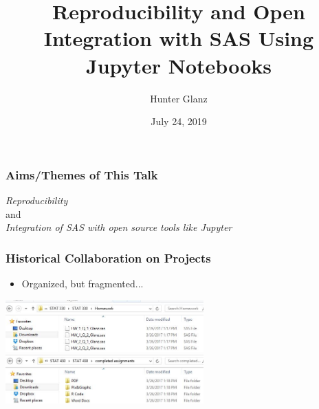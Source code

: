 \documentclass[xcolor={dvipsnames}]{beamer}
\title[]{Reproducibility and Open Integration with SAS Using Jupyter Notebooks}
\author[Glanz]{Hunter Glanz}
\institute[]{California Polytechnic State University \\ San Luis Obispo, California, USA}
\date{July 24, 2019}
\newcommand{\ft}{\frametitle}
\newcommand{\bi}{\begin{itemize}}
\newcommand{\ei}{\end{itemize}}
\begin{document}
\frame{\titlepage}


\begin{frame}
\ft{Aims/Themes of This Talk}
\begin{center}
	\emph{Reproducibility} \\
	\pause
	and \\
	\emph{Integration of SAS with open source tools like Jupyter}
\end{center}
\end{frame}

\begin{frame}
\frametitle{Historical Collaboration on Projects}
\bi
	\item Organized, but fragmented...
\ei
\pause
\begin{center}
	\includegraphics[width = 3in]{STAT330Files.JPG} \\ \vspace{.5in}
	\includegraphics[width = 3in]{STAT331Files.JPG}
\end{center}
\end{frame}
\end{document}
